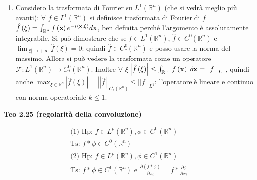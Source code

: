 \documentclass{article}
\begin{document}
\begin{enumerate}
\item Considero la trasformata di Fourier su $L^{1}\left( 
\mathbb{R}
^{n}\right) $ (che si vedr\`{a} meglio pi\`{u} avanti): $\forall $ $f\in
L^{1}\left( 
\mathbb{R}
^{n}\right) $ si definisce trasformata di Fourier di $f$ $\hat{f}\left( \xi
\right) =\int_{%
\mathbb{R}
^{n}}f\left( \mathbf{x}\right) e^{-i\left\langle \mathbf{x},\xi
\right\rangle }d\mathbf{x}$, ben definita perch\'{e} l'argomento \`{e}
assolutamente integrabile. Si pu\`{o} dimostrare che se $f\in L^{1}\left( 
\mathbb{R}
^{n}\right) $, $\hat{f}\in C^{0}\left( 
\mathbb{R}
^{n}\right) $ e $\lim_{\left\vert \xi \right\vert \rightarrow +\infty }\hat{f%
}\left( \xi \right) =0$: quindi $\hat{f}\in C_{\ast }^{0}\left( 
\mathbb{R}
^{n}\right) $ e posso usare la norma del massimo. Allora si pu\`{o} vedere
la trasformata come un operatore $\mathcal{F}:L^{1}\left( 
\mathbb{R}
^{n}\right) \rightarrow C_{\ast }^{0}\left( 
\mathbb{R}
^{n}\right) $. Inoltre $\forall $ $\xi $ $\left\vert \hat{f}\left( \xi
\right) \right\vert \leq \int_{%
\mathbb{R}
^{n}}\left\vert f\left( \mathbf{x}\right) \right\vert d\mathbf{x=}\left\vert
\left\vert f\right\vert \right\vert _{L^{1}}$, quindi anche $\max_{\xi \in 
\mathbb{R}
^{n}}\left\vert \hat{f}\left( \xi \right) \right\vert =\left\vert \left\vert 
\hat{f}\right\vert \right\vert _{C_{\ast }^{0}\left( 
\mathbb{R}
^{n}\right) }\leq \left\vert \left\vert f\right\vert \right\vert _{L^{1}}$:
l'operatore \`{e} lineare e continuo con norma operatoriale $k\leq 1$.
\end{enumerate}

\textbf{Teo 2.25 (regolarit\`{a} della convoluzione)}

\begin{gather*}
\text{(1) Hp}\text{: }f\in L^{p}\left( 
\mathbb{R}
^{n}\right) ,\phi \in C^{0}\left( 
\mathbb{R}
^{n}\right) \\
\text{Ts: }f\ast \phi \in C^{0}\left( 
\mathbb{R}
^{n}\right) \\
\text{(2) Hp}\text{: }f\in L^{p}\left( 
\mathbb{R}
^{n}\right) ,\phi \in C^{1}\left( 
\mathbb{R}
^{n}\right) \\
\text{Ts: }f\ast \phi \in C^{1}\left( 
\mathbb{R}
^{n}\right) \text{ e }\frac{\partial \left( f\ast \phi \right) }{\partial
x_{i}}=f\ast \frac{\partial \phi }{\partial x_{i}}
\end{gather*}
\end{document}
